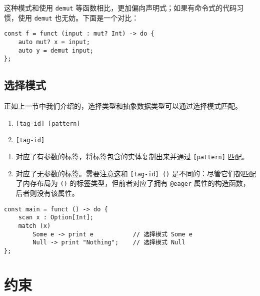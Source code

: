 这种模式和使用 \lstinline!demut! 等函数相比，更加偏向声明式；如果有命令式的代码习惯，使用 \lstinline!demut! 也无妨。下面是一个对比：

\begin{minipage}[c]{0.95\textwidth}
\vspace{1.0em}
\begin{lstlisting}
const f = funct (input : mut? Int) -> do {
    auto mut? x = input;
    auto y = demut input;
};
\end{lstlisting}
\end{minipage}

\subsection{选择模式}

正如上一节中我们介绍的，选择类型和抽象数据类型可以通过选择模式匹配。

\begin{grammar} \label{grm:choice-pattern}
\begin{enumerate}
    \item \lstinline![tag-id] [pattern]!
    \item \lstinline![tag-id]!
\end{enumerate}
\end{grammar}

\begin{enumerate}
    \item 对应了有参数的标签，将标签包含的实体复制出来并通过 \lstinline![pattern]! 匹配。
    \item 对应了无参数的标签。需要注意这和 \lstinline![tag-id] ()! 是不同的：尽管它们都匹配了内存布局为 \lstinline!()! 的标签类型，但前者对应了拥有 \lstinline!@eager! 属性的构造函数，后者则没有该属性。
\end{enumerate}

\begin{minipage}[c]{0.95\textwidth}
\vspace{1.0em}
\begin{lstlisting}
const main = funct () -> do {
    scan x : Option[Int];
    match (x)
        Some e -> print e           // 选择模式 Some e
        Null -> print "Nothing";    // 选择模式 Null
};
\end{lstlisting}
\end{minipage}


\section{约束}

